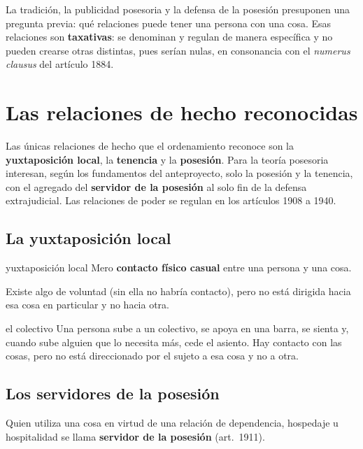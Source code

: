 \documentclass[12pt,oneside]{book}
\begin{document}
La tradición, la publicidad posesoria y la defensa de la posesión presuponen una pregunta previa: qué relaciones puede tener una persona con una cosa. Esas relaciones son \textbf{taxativas}: se denominan y regulan de manera específica y no pueden crearse otras distintas, pues serían nulas, en consonancia con el \textit{numerus clausus} del artículo 1884.

\section{Las relaciones de hecho reconocidas}

Las únicas relaciones de hecho que el ordenamiento reconoce son la \textbf{yuxtaposición local}, la \textbf{tenencia} y la \textbf{posesión}. Para la teoría posesoria interesan, según los fundamentos del anteproyecto, solo la posesión y la tenencia, con el agregado del \textbf{servidor de la posesión} al solo fin de la defensa extrajudicial. Las relaciones de poder se regulan en los artículos 1908 a 1940.

\subsection{La yuxtaposición local}

\begin{definicion}{yuxtaposición local}
Mero \textbf{contacto físico casual} entre una persona y una cosa.
\end{definicion}

Existe algo de voluntad (sin ella no habría contacto), pero no está dirigida hacia esa cosa en particular y no hacia otra.

\begin{ejemplo}{el colectivo}
Una persona sube a un colectivo, se apoya en una barra, se sienta y, cuando sube alguien que lo necesita más, cede el asiento. Hay contacto con las cosas, pero no está direccionado por el sujeto a esa cosa y no a otra.
\end{ejemplo}

\subsection{Los servidores de la posesión}

Quien utiliza una cosa en virtud de una relación de dependencia, hospedaje u hospitalidad se llama \textbf{servidor de la posesión} (art.~1911).
\end{document}
